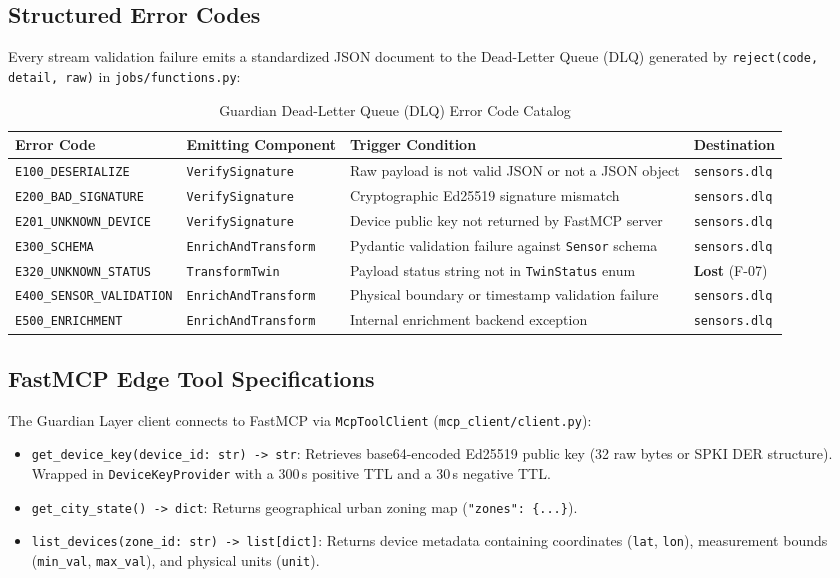 \documentclass[10pt,a4paper]{report}
\begin{document}
\subsection{Structured Error Codes}
Every stream validation failure emits a standardized JSON document to the Dead-Letter Queue (DLQ) generated by \texttt{reject(code, detail, raw)} in \texttt{jobs/functions.py}:
\begin{table}[htbp]
\centering
\small
\caption{Guardian Dead-Letter Queue (DLQ) Error Code Catalog}
\label{tab:error_codes}
\begin{tabularx}{\textwidth}{llXl}
\toprule
\textbf{Error Code} & \textbf{Emitting Component} & \textbf{Trigger Condition} & \textbf{Destination} \\
\midrule
\texttt{E100\_DESERIALIZE} & \texttt{VerifySignature} & Raw payload is not valid JSON or not a JSON object & \texttt{sensors.dlq} \\
\texttt{E200\_BAD\_SIGNATURE} & \texttt{VerifySignature} & Cryptographic Ed25519 signature mismatch & \texttt{sensors.dlq} \\
\texttt{E201\_UNKNOWN\_DEVICE} & \texttt{VerifySignature} & Device public key not returned by FastMCP server & \texttt{sensors.dlq} \\
\texttt{E300\_SCHEMA} & \texttt{EnrichAndTransform} & Pydantic validation failure against \texttt{Sensor} schema & \texttt{sensors.dlq} \\
\texttt{E320\_UNKNOWN\_STATUS} & \texttt{TransformTwin} & Payload status string not in \texttt{TwinStatus} enum & \textbf{Lost} (F-07) \\
\texttt{E400\_SENSOR\_VALIDATION} & \texttt{EnrichAndTransform} & Physical boundary or timestamp validation failure & \texttt{sensors.dlq} \\
\texttt{E500\_ENRICHMENT} & \texttt{EnrichAndTransform} & Internal enrichment backend exception & \texttt{sensors.dlq} \\
\bottomrule
\end{tabularx}
\end{table}

\subsection{FastMCP Edge Tool Specifications}
The Guardian Layer client connects to FastMCP via \texttt{McpToolClient} (\texttt{mcp\_client/client.py}):
\begin{itemize}[leftmargin=*]
  \item \texttt{get\_device\_key(device\_id: str) -> str}: Retrieves base64-encoded Ed25519 public key (32 raw bytes or SPKI DER structure). Wrapped in \texttt{DeviceKeyProvider} with a 300\,s positive TTL and a 30\,s negative TTL.
  \item \texttt{get\_city\_state() -> dict}: Returns geographical urban zoning map (\texttt{"zones": \{...\}}).
  \item \texttt{list\_devices(zone\_id: str) -> list[dict]}: Returns device metadata containing coordinates (\texttt{lat}, \texttt{lon}), measurement bounds (\texttt{min\_val}, \texttt{max\_val}), and physical units (\texttt{unit}).
\end{itemize}
\end{document}
